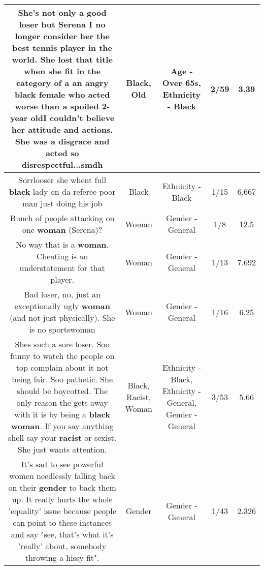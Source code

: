 \documentclass[11pt]{article}
\newlength\mylength
\begin{document}
\begin{center}
\begin{longtable}{|C{.65\mylength}|C{.30\mylength}|C{.12\mylength}|C{.12\mylength}|C{.12\mylength}|}
  \small She's not only a good loser but Serena I no longer consider her the best tennis player in the world. She lost that title when she fit in the category of a an angry \textbf{black} female who acted worse than a spoiled 2-year \textbf{old}I couldn't believe her attitude and actions. She was a disgrace and acted so disrespectful...smdh\normalsize   & Black, Old & Age - Over 65s, Ethnicity - Black & 2/59 & 3.39 \\  \hline
  \small Sorrlooser she whent full \textbf{black} lady on da referee poor man just doing his job\normalsize   & Black & Ethnicity - Black & 1/15 & 6.667 \\  \hline
  \small Bunch of people attacking on one \textbf{woman} (Serena)?\normalsize   & Woman & Gender - General & 1/8 & 12.5 \\  \hline
  \small No way that is a \textbf{woman}. Cheating is an understatement for that player.\normalsize   & Woman & Gender - General & 1/13 & 7.692 \\  \hline
  \small Bad loser, no, just an exceptionally ugly \textbf{woman} (and not just physically). She is no sportswoman\normalsize   & Woman & Gender - General & 1/16 & 6.25 \\  \hline
  \small Shes such a sore loser. Soo funny to watch the people on top complain about it not being fair. Soo pathetic. She should be boycotted. The only reason the gets away with it is by being a \textbf{black} \textbf{woman}. If you say anything shell say your \textbf{racist} or sexist. She just wants attention.\normalsize   & Black, Racist, Woman & Ethnicity - Black, Ethnicity - General, Gender - General & 3/53 & 5.66 \\  \hline
  \small It's sad to see powerful women needlessly falling back on their \textbf{gender} to back them up. It really hurts the whole 'equality' issue because people can point to these instances and say "see, that's what it's 'really' about, somebody throwing a hissy fit".\normalsize   & Gender & Gender - General & 1/43 & 2.326 \\  \hline

\end{longtable}
\end{center}
\end{document}
